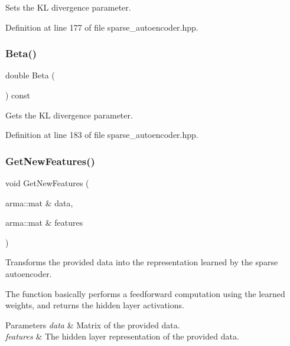 Sets the KL divergence parameter. 



Definition at line 177 of file sparse\+\_\+autoencoder.\+hpp.

\mbox{\label{classmlpack_1_1nn_1_1SparseAutoencoder_ad1b9206255af52171cb88dfb7c326576}} 
\subsubsection{Beta()\hspace{0.1cm}{\footnotesize\ttfamily [2/2]}}
{\footnotesize\ttfamily double Beta (\begin{DoxyParamCaption}{ }\end{DoxyParamCaption}) const\hspace{0.3cm}{\ttfamily [inline]}}



Gets the KL divergence parameter. 



Definition at line 183 of file sparse\+\_\+autoencoder.\+hpp.

\mbox{\label{classmlpack_1_1nn_1_1SparseAutoencoder_ad16d07cc1fe0b0df569ab3c0ca0562fb}} 
\subsubsection{Get\+New\+Features()}
{\footnotesize\ttfamily void Get\+New\+Features (\begin{DoxyParamCaption}\item[{arma\+::mat \&}]{data,  }\item[{arma\+::mat \&}]{features }\end{DoxyParamCaption})}



Transforms the provided data into the representation learned by the sparse autoencoder. 

The function basically performs a feedforward computation using the learned weights, and returns the hidden layer activations.


\begin{DoxyParams}{Parameters}
{\em data} & Matrix of the provided data. \\
\hline
{\em features} & The hidden layer representation of the provided data. \\
\hline
\end{DoxyParams}
\mbox{\label{classmlpack_1_1nn_1_1SparseAutoencoder_aef6f7e6478c5268a8762768f2bed7cf3}} 
